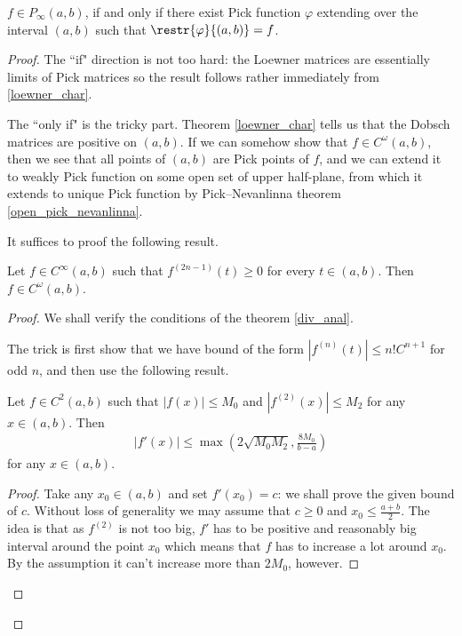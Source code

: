 \begin{lause}\label{loewners_theorem}
	$f \in P_{\infty}(a, b)$, if and only if there exist Pick function $\varphi$ extending over the interval $(a, b)$ such that $\restr{\varphi}{(a, b)} = f$.
\end{lause}

\begin{proof}
	The ``if" direction is not too hard: the Loewner matrices are essentially limits of Pick matrices so the result follows rather immediately from \ref{loewner_char}.

	The ``only if" is the tricky part. Theorem \ref{loewner_char} tells us that the Dobsch matrices are positive on $(a, b)$. If we can somehow show that $f \in C^{\omega}(a, b)$, then we see that all points of $(a, b)$ are Pick points of $f$, and we can extend it to weakly Pick function on some open set of upper half-plane, from which it extends to unique Pick function by Pick--Nevanlinna theorem \ref{open_pick_nevanlinna}.

	It suffices to proof the following result.

	\begin{lem}
		Let $f \in C^{\infty}(a, b)$ such that $f^{(2 n - 1)}(t) \geq 0$ for every $t \in (a, b)$. Then $f \in C^{\omega}(a, b)$.
	\end{lem}
	\begin{proof}
		We shall verify the conditions of the theorem \ref{div_anal}.

		The trick is first show that we have bound of the form $|f^{(n)}(t)| \leq n! C^{n + 1}$ for odd $n$, and then use the following result.
		\begin{lem}
			Let $f \in C^{2}(a, b)$ such that $|f(x)| \leq M_{0}$ and $|f^{(2)}(x)| \leq M_{2}$ for any $x \in (a, b)$. Then
			\begin{align*}
			|f'(x)| \leq \max\left(2\sqrt{M_{0} M_{2}}, \frac{8 M_{0}}{b - a}\right)
			\end{align*}
			for any $x \in (a, b)$.
		\end{lem}
		\begin{proof}
			Take any $x_{0} \in (a, b)$ and set $f'(x_{0}) = c$: we shall prove the given bound of $c$. Without loss of generality we may assume that $c \geq 0$ and $x_{0} \leq \frac{a + b}{2}$. The idea is that as $f^{(2)}$ is not too big, $f'$ has to be positive and reasonably big interval around the point $x_{0}$ which means that $f$ has to increase a lot around $x_{0}$. By the assumption it can't increase more than $2 M_{0}$, however.


\end{proof}
\end{proof}
\end{proof}

